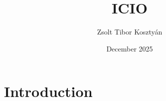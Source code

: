 \documentclass{article}
\title{ICIO}
\author{Zsolt Tibor Kosztyán}
\date{December 2025}
\begin{document}
\maketitle

\section{Introduction}
\end{document}

